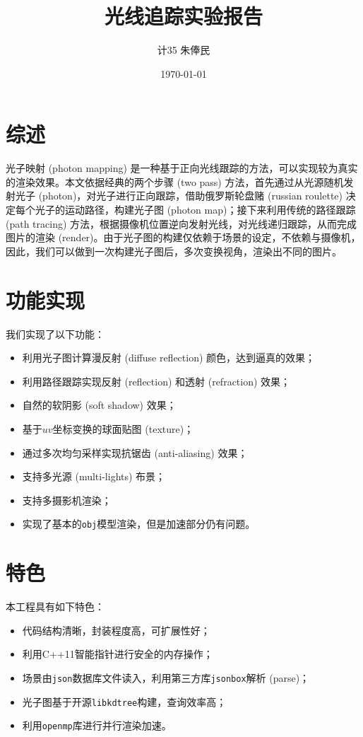\documentclass[11pt, a4paper]{article}
\title{\hei 光线追踪实验报告}
\author{\kai \quad 计35 \quad 朱俸民 \quad 2012011894}
\date{\kai \today}
\begin{document}
\maketitle

\section{综述}

光子映射 (photon mapping) 是一种基于正向光线跟踪的方法，可以实现较为真实的渲染效果。本文依据经典的两个步骤 (two pass) 方法，首先通过从光源随机发射光子 (photon)，对光子进行正向跟踪，借助俄罗斯轮盘赌 (russian roulette) 决定每个光子的运动路径，构建光子图 (photon map)；接下来利用传统的路径跟踪 (path tracing) 方法，根据摄像机位置逆向发射光线，对光线递归跟踪，从而完成图片的渲染 (render)。由于光子图的构建仅依赖于场景的设定，不依赖与摄像机，因此，我们可以做到一次构建光子图后，多次变换视角，渲染出不同的图片。

\section{功能实现}

我们实现了以下功能：

\begin{itemize}
    \item 利用光子图计算漫反射 (diffuse reflection) 颜色，达到逼真的效果；
    \item 利用路径跟踪实现反射 (reflection) 和透射 (refraction) 效果；
    \item 自然的软阴影 (soft shadow) 效果；
    \item 基于$uv$坐标变换的球面贴图 (texture)；
    \item 通过多次均匀采样实现抗锯齿 (anti-aliasing) 效果；
    \item 支持多光源 (multi-lights) 布景；
    \item 支持多摄影机渲染；
    \item 实现了基本的\texttt{obj}模型渲染，但是加速部分仍有问题。
\end{itemize}

\section{特色}

本工程具有如下特色：

\begin{itemize}
    \item 代码结构清晰，封装程度高，可扩展性好；
    \item 利用C++11智能指针进行安全的内存操作；
    \item 场景由\texttt{json}数据库文件读入，利用第三方库\texttt{jsonbox}解析 (parse)；
    \item 光子图基于开源\texttt{libkdtree}构建，查询效率高；
    \item 利用\texttt{openmp}库进行并行渲染加速。
\end{itemize}
\end{document}
